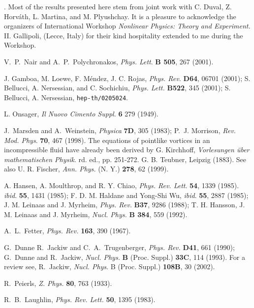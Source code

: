 \documentclass[a4paper,12pt]{article}
\begin{document}
\vskip2mm
.
Most of the results presented here stem from
joint work with C. Duval, Z. Horv\'ath, L. Martina, and M. Plyushchay.
It is a pleasure to acknowledge the organizers of
International Workshop {\it Nonlinear Physics: Theory and Experiment. 
}{\rm II}. Gallipoli, (Lecce, Italy)
for their kind hospitality extended to me during the Workshop.

\goodbreak
\begin{thebibliography}{0}
    
V.~P.~Nair and A.~P.~Polychronakos,
{\it  Phys. Lett}. {\bf B 505}, 267 (2001).

J. Gamboa, M. Loewe, F. M\'endez, J. C. Rojas,
{\it Phys. Rev.} {\bf D64}, 06701 (2001);
S. Bellucci, A. Nersessian, and C. Sochichiu,
{\it Phys. Lett.} {\bf B522}, 345 (2001);
S. Bellucci, A. Nersessian, \texttt{hep-th/0205024}.

L. Onsager, 
{\it Il Nuovo Cimento Suppl.} {\bf 6} 279 (1949).

J.~Marsden and A.~Weinstein,
 {\it Physica} {\bf 7D}, 305 (1983);
 P.~J. Morrison, {\it Rev. Mod. Phys}. {\bf 70}, 467 (1998).  
The equations of pointlike vortices in an incompressible
fluid have already been derived by
 G. Kirchhoff, {\it Vorlesungen \"uber mathematischen Physik}.
 \coordHE{}rd. ed., pp. 251-272. G. B. Teubner, Leipzig (1883).
 See also
 U. R. Fischer, {\it Ann. Phys.} (N. Y.) {\bf 278}, 62 (1999).

A. Hansen, A. Moulthrop, and R. Y. Chiao,
 {\it Phys. Rev. Lett}. {\bf 54}, 1339 (1985).
 {\it ibid}. {\bf 55}, 1431 (1985);
F. D. M. Haldane and Yong-Shi Wu,
{\it ibid}. {\bf 55}, 2887 (1985);
 J. M. Leinaas and J. Myrheim,
 {\it Phys. Rev.} {\bf B37},  9286 (1988);
 T. H. Hansson, J. M. Leinaas and J. Myrheim,
 {\it Nucl. Phys.} {\bf B 384},  559 (1992).
  
A.~L.~Fetter,
{\it Phys. Rev.} {\bf 163}, 390 (1967).

G.~Dunne R.~Jackiw and C.~A.~Trugenberger,
{\it Phys. Rev.} {\bf D41},  661 (1990); 
G.~Dunne and R.~Jackiw,
{\it Nucl. Phys.} {\bf B} (Proc. Suppl.) {\bf 33C}, 114 (1993).
For a review see, 
R.~Jackiw,
{\it Nucl. Phys}. {B} (Proc. Suppl.) {\bf 108B}, 30 (2002). 

R.~Peierls,
 {\it Z. Phys.} {\bf 80}, 763 (1933).

 R.~B.~Laughlin, 
 {\it Phys. Rev. Lett.} {\bf 50}, 1395 (1983).
 

\end{thebibliography}
\end{document}
